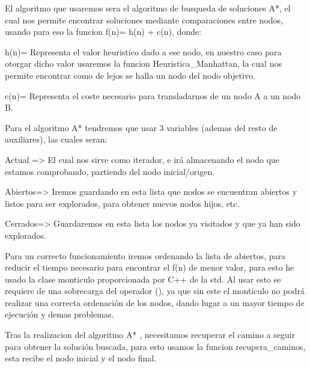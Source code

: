 
El algoritmo que usaremos sera el algoritmo de busqueda de soluciones A*, el cual 
nos permite encontrar soluciones mediante comparaciones entre nodos, usando para 
eso la funcion f(n)= h(n) + c(n), donde:

    h(n)= Representa el valor heuristico dado a ese nodo, en nuestro caso para 
    otorgar dicho valor usaremos la funcion Heuristica_Manhattan, la cual nos 
    permite encontrar como de lejos se halla un nodo del nodo objetivo.

    c(n)= Representa el coste necesario para transladarnos de un nodo A a un nodo B.

Para el algoritmo A* tendremos que usar 3 variables (ademas del resto de auxiliares), 
las cuales seran: 

    Actual => El cual nos sirve como iterador, e irá almacenando el nodo que estamos 
    comprobando, partiendo del nodo inicial/origen.

    Abiertos=> Iremos guardando en esta lista que nodos se encuentran abiertos y listos 
    para ser explorados, para obtener nuevos nodos hijos, etc.

    Cerrados=> Guardaremos en esta lista los nodos ya visitados y que ya han sido explorados.

Para un correcto funcionamiento iremos ordenando la lista de abiertos, para reducir el tiempo 
necesario para encontrar el f(n) de menor valor, para esto he usado la clase monticulo 
proporcionada por C++ de la std.
Al usar esto se requiere de una sobrecarga del operador (), ya que sin este el monticulo 
no podrá realizar una correcta ordenación de los nodos, dando lugar a un mayor tiempo 
de ejecución y demas problemas.

Tras la realizacion del algoritmo A* , necesitamos recuperar el camino a seguir para obtener
la solución buscada, para esto usamos la funcion recupera_caminos, esta recibe el nodo inicial
y el nodo final.